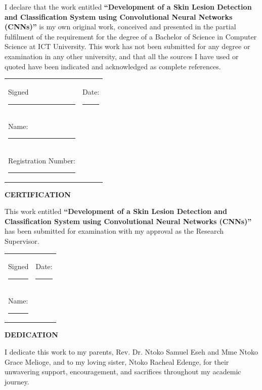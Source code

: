 \documentclass[
  12pt,
  oneside]{article}
\begin{document}
\vspace{1cm}

I declare that the work entitled \textbf{``Development of a Skin Lesion Detection and Classification System using Convolutional Neural Networks (CNNs)''} is my own original work, conceived and presented in the partial fulfilment of the requirement for the degree of a Bachelor of Science in Computer Science at ICT University. This work has not been submitted for any degree or examination in any other university, and that all the sources I have used or quoted have been indicated and acknowledged as complete references.

\vspace{1.2cm}

\begin{tabular}{ll}
Signed \rule{4cm}{0.15mm} \hspace{3cm} & Date: \rule{4cm}{0.15mm} \\ [0.5cm]
Name: \rule{4cm}{0.15mm} & \\ [0.5cm]
Registration Number: \rule{4cm}{0.15mm} & \\
\end{tabular}
\vfill
\clearpage
\thispagestyle{empty}
\begin{center}
\textbf{\large CERTIFICATION}
\end{center}

\vspace{1cm}

This work entitled \textbf{``Development of a Skin Lesion Detection and Classification System using Convolutional Neural Networks (CNNs)''} has been submitted for examination with my approval as the Research Supervisor.

\vspace{2cm}

\begin{tabular}{ll}
Signed \rule{4cm}{0.15mm} \hspace{3cm} & Date: \rule{4cm}{0.15mm} \\ [0.5cm]
Name: \rule{4cm}{0.15mm} & \\
\end{tabular}
\clearpage

\thispagestyle{empty}
\begin{center}
\textbf{\large DEDICATION}
\end{center}

\vspace{2cm} %

I dedicate this work to my parents, Rev. Dr. Ntoko Samuel Eseh and Mme Ntoko Grace Melioge, and to my loving sister, Ntoko Racheal Edenge, for their unwavering support, encouragement, and sacrifices throughout my academic journey.
\end{document}
